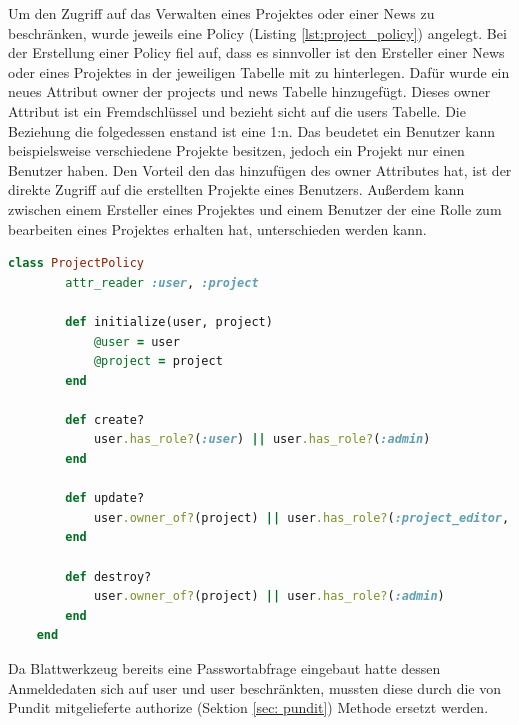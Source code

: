 \documentclass[paper=a4,fontsize=12pt,parskip=half]{scrartcl}
\begin{document}
	Um den Zugriff auf das Verwalten eines Projektes oder einer News zu beschränken, wurde jeweils eine Policy (Listing \ref{lst:project_policy}) angelegt. Bei der Erstellung einer Policy fiel auf, dass es sinnvoller ist den Ersteller einer News oder eines Projektes in der jeweiligen Tabelle mit zu hinterlegen. Dafür wurde ein neues Attribut owner der projects und news Tabelle hinzugefügt. Dieses owner Attribut ist ein Fremdschlüssel und bezieht sicht auf die users Tabelle. Die Beziehung die folgedessen enstand ist eine 1:n. Das beudetet ein Benutzer kann beispielsweise verschiedene Projekte besitzen, jedoch ein Projekt nur einen Benutzer haben. Den Vorteil den das hinzufügen des owner Attributes hat, ist der direkte Zugriff auf die erstellten Projekte eines Benutzers. Außerdem kann zwischen einem Ersteller eines Projektes und einem Benutzer der eine Rolle zum bearbeiten eines Projektes erhalten hat, unterschieden werden kann.

	\begin{lstlisting}[language=Ruby, style=CodeView, caption=Policy zur Autorisierung eines Zugriffs auf ein Projekt, captionpos=b, label={lst:project_policy}]
	class ProjectPolicy
		attr_reader :user, :project

		def initialize(user, project)
			@user = user
			@project = project
		end

		def create?
			user.has_role?(:user) || user.has_role?(:admin)
		end

		def update?
			user.owner_of?(project) || user.has_role?(:project_editor, project) || user.has_role?(:admin)
		end

		def destroy?
			user.owner_of?(project) || user.has_role?(:admin)
		end
	end
	\end{lstlisting}

	Da Blattwerkzeug bereits eine Passwortabfrage eingebaut hatte dessen Anmeldedaten sich auf user und user beschränkten, mussten diese durch die von Pundit mitgelieferte authorize (Sektion \ref{sec: pundit}) Methode ersetzt werden.

\end{document}
